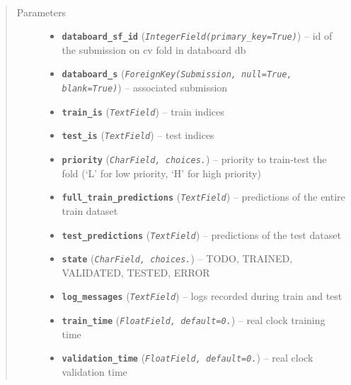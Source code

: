 \documentclass[letterpaper,10pt,english]{sphinxmanual}
\begin{document}

\begin{fulllineitems}
\label{modules/models:runapp.models.SubmissionFold}~\begin{quote}\begin{description}
\item[{Parameters}] \leavevmode\begin{itemize}
\item {} 
\textbf{\texttt{databoard\_sf\_id}} (\emph{\texttt{IntegerField(primary\_key=True)}}) -- id of the submission on cv fold in databoard db

\item {} 
\textbf{\texttt{databoard\_s}} (\emph{\texttt{ForeignKey(Submission, null=True, blank=True)}}) -- associated submission

\item {} 
\textbf{\texttt{train\_is}} (\emph{\texttt{TextField}}) -- train indices

\item {} 
\textbf{\texttt{test\_is}} (\emph{\texttt{TextField}}) -- test indices

\item {} 
\textbf{\texttt{priority}} (\emph{\texttt{CharField, choices.}}) -- priority to train-test the fold        (`L' for low priority, `H' for high priority)

\item {} 
\textbf{\texttt{full\_train\_predictions}} (\emph{\texttt{TextField}}) -- predictions of the entire train dataset

\item {} 
\textbf{\texttt{test\_predictions}} (\emph{\texttt{TextField}}) -- predictions of the test dataset

\item {} 
\textbf{\texttt{state}} (\emph{\texttt{CharField, choices.}}) -- TODO, TRAINED, VALIDATED, TESTED, ERROR

\item {} 
\textbf{\texttt{log\_messages}} (\emph{\texttt{TextField}}) -- logs recorded during train and test

\item {} 
\textbf{\texttt{train\_time}} (\emph{\texttt{FloatField, default=0.}}) -- real clock training time

\item {} 
\textbf{\texttt{validation\_time}} (\emph{\texttt{FloatField, default=0.}}) -- real clock validation time


\end{itemize}
\end{description}
\end{quote}
\end{fulllineitems}
\end{document}
